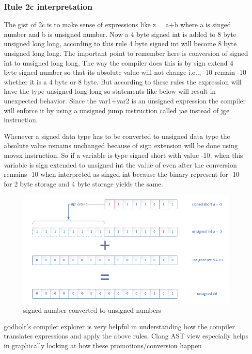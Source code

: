 \documentclass{article}
\begin{document}
\subsubsection{Rule 2c interpretation}
The gist of 2c is to make sense of
expressions like z = a+b where a is singed number and b is unsigned number. Now
a 4 byte signed int is added to 8 byte unsigned long long, according
to this rule 4 byte signed int will become 8 byte unsigned long long. The
important point to remember here is conversion of signed int to unsigned long
long, The way the compiler does this is by sign extend 4 byte signed number so
that its absolute value will not change i.e.., -10 remain -10 whether it is a 4
byte or 8 byte. But according to these rules the expression will have the type
unsigned long long so statements like below will result in unexpected behavior.
Since the var1+var2 is an unsigned expression the compiler will enforce it by
using a unsigned jump instruction called jae instead of jge instruction.

Whenever a signed data type has to be converted to unsigned data type the
absolute value remains unchanged because of sign extension will be done using
movsx instruction. So if a variable is type signed short with value -10, when
this variable is sign extended to unsigned int the value of even after the
conversion remains -10 when interpreted as singed int because the binary
represent for -10 for 2 byte storage and 4 byte storage yields the same.

\begin{figure}[H]
\centering
\includegraphics[width=\textwidth]{signed-short-to-unsigned-int.png}
\caption{signed number converted to unsigned numbers}
\end{figure}

\href{https://godbolt.org/}{godbolt's compiler explorer} is very helpful in
understanding how the compiler translates expressions and apply the above rules.
Clang AST view especially helps in graphically looking at how these
promotions/conversion happen
\end{document}
